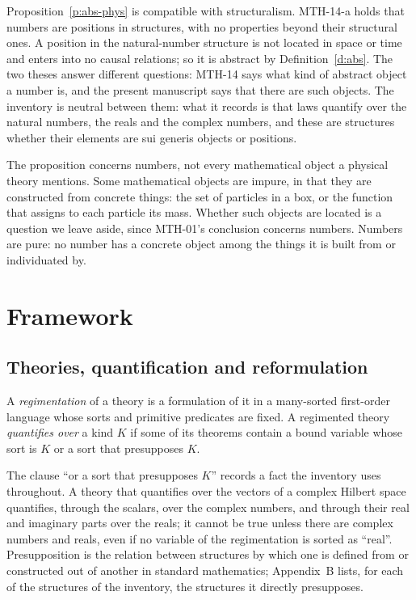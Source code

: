 \documentclass{situationist-preprint}
\begin{document}
\begin{remark}\label{r:struct}
Proposition~\ref{p:abs-phys} is compatible with structuralism. MTH-14-a holds that numbers are positions in structures, with no properties beyond their structural ones. A position in the natural-number structure is not located in space or time and enters into no causal relations; so it is abstract by Definition~\ref{d:abs}. The two theses answer different questions: MTH-14 says what kind of abstract object a number is, and the present manuscript says that there are such objects. The inventory is neutral between them: what it records is that laws quantify over the natural numbers, the reals and the complex numbers, and these are structures whether their elements are sui generis objects or positions.
\end{remark}

\begin{remark}\label{r:impure}
The proposition concerns numbers, not every mathematical object a physical theory mentions. Some mathematical objects are impure, in that they are constructed from concrete things: the set of particles in a box, or the function that assigns to each particle its mass. Whether such objects are located is a question we leave aside, since MTH-01's conclusion concerns numbers. Numbers are pure: no number has a concrete object among the things it is built from or individuated by.
\end{remark}

\section{Framework}\label{s:frame}

\subsection{Theories, quantification and reformulation}

\begin{definition}\label{d:regim}
A \emph{regimentation} of a theory is a formulation of it in a many-sorted first-order language whose sorts and primitive predicates are fixed. A regimented theory \emph{quantifies over} a kind $K$ if some of its theorems contain a bound variable whose sort is $K$ or a sort that presupposes $K$.
\end{definition}

The clause \enquote{or a sort that presupposes $K$} records a fact the inventory uses throughout. A theory that quantifies over the vectors of a complex Hilbert space quantifies, through the scalars, over the complex numbers, and through their real and imaginary parts over the reals; it cannot be true unless there are complex numbers and reals, even if no variable of the regimentation is sorted as \enquote{real}. Presupposition is the relation between structures by which one is defined from or constructed out of another in standard mathematics; Appendix~B lists, for each of the \nStructures{} structures of the inventory, the structures it directly presupposes.
\end{document}
